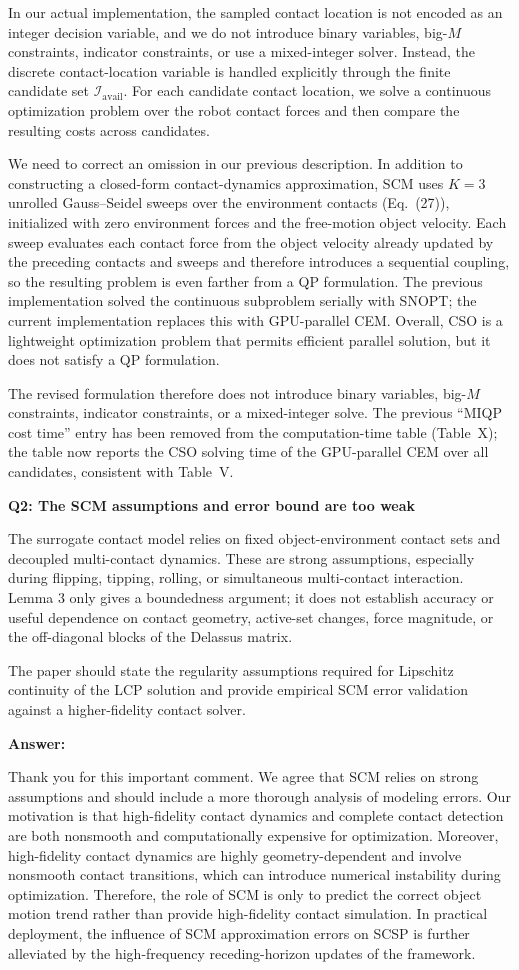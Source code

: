 \documentclass[journal,10pt]{IEEEtran}
\newcommand{\question}[2]{\par\smallskip\noindent
 \color{responseblue}\textbf{Q#1: #2}\par\nobreak\noindent\color{responseblue}}
\newcommand{\answer}{\par\smallskip\noindent\color{black}\textbf{Answer: }\ignorespaces
}
\begin{document}
In our actual implementation, the sampled contact location is not
encoded as an integer decision variable, and we do not introduce
binary variables, big-$M$ constraints, indicator constraints, or use
a mixed-integer solver. Instead, the discrete contact-location variable
is handled explicitly through the finite candidate set
$\mathcal{I}_{\mathrm{avail}}$. For each candidate contact location,
we solve a continuous optimization problem over the robot contact
forces and then compare the resulting costs across candidates.

We need to correct an omission in our previous description. In addition to constructing a closed-form contact-dynamics approximation, SCM uses $K=3$ unrolled Gauss--Seidel sweeps over the environment contacts (Eq.~(27)), initialized with zero environment forces and the free-motion object velocity. Each sweep evaluates each contact force from the object velocity already updated by the preceding contacts and sweeps and therefore introduces a sequential coupling, so the resulting problem is even farther from a QP formulation. The previous implementation solved the continuous subproblem serially with SNOPT; the current implementation replaces this with GPU-parallel CEM. Overall, CSO is a lightweight optimization problem that permits efficient parallel solution, but it does not satisfy a QP formulation.

The revised formulation therefore does not introduce binary variables, big-$M$ constraints, indicator constraints, or a mixed-integer solve. The previous ``MIQP cost time'' entry has been removed from the computation-time table (Table~X); the table now reports the CSO solving time of the GPU-parallel CEM over all candidates, consistent with Table~V.
\question{2}{The SCM assumptions and error bound are too weak}

The surrogate contact model relies on fixed object-environment contact sets and decoupled multi-contact dynamics. These are strong assumptions, especially during flipping, tipping, rolling, or simultaneous multi-contact interaction. Lemma 3 only gives a boundedness argument; it does not establish accuracy or useful dependence on contact geometry, active-set changes, force magnitude, or the off-diagonal blocks of the Delassus matrix.

The paper should state the regularity assumptions required for Lipschitz continuity of the LCP solution and provide empirical SCM error validation against a higher-fidelity contact solver.
\answer
Thank you for this important comment. We agree that SCM relies on strong assumptions and should include a more thorough analysis of modeling errors. Our motivation is that high-fidelity contact dynamics and complete contact detection are both nonsmooth and computationally expensive for optimization. Moreover, high-fidelity contact dynamics are highly geometry-dependent and involve nonsmooth contact transitions, which can introduce numerical instability during optimization. Therefore, the role of SCM is only to predict the correct object motion trend rather than provide high-fidelity contact simulation. In practical deployment, the influence of SCM approximation errors on SCSP is further alleviated by the high-frequency receding-horizon updates of the framework.
\end{document}

